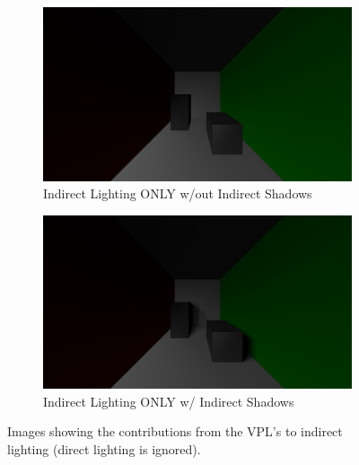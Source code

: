 \begin{figure}
        \centering
        \begin{subfigure}[b]{1.0\textwidth}
                \includegraphics[width=\textwidth]{indirect_only.jpg}
                \caption{Indirect Lighting ONLY w/out Indirect Shadows}
                \label{fig:indirectonly}
        \end{subfigure}
        \begin{subfigure}[b]{1.0\textwidth}
                \includegraphics[width=\textwidth]{indirect_only_shadows.jpg}
                \caption{Indirect Lighting ONLY w/ Indirect Shadows}
                \label{fig:indirectonlyshadows}
        \end{subfigure}
        \caption{Images showing the contributions from the VPL's to indirect lighting (direct lighting is ignored).}\label{fig:indirect}
\end{figure}



